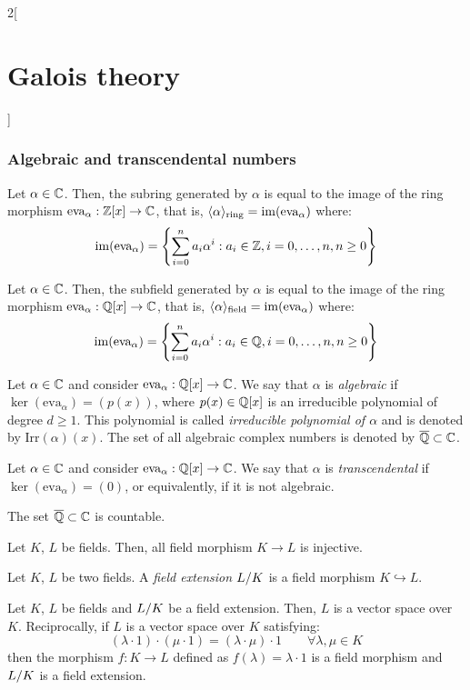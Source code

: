 \documentclass[../../../main.tex]{subfiles}
\begin{document}
\begin{multicols}{2}[\section{Galois theory}]
  \subsubsection*{Algebraic and transcendental numbers}
  \begin{prop}
    Let $\alpha\in\mathbb{C}$. Then, the subring generated by $\alpha$ is equal to the image of the ring morphism $\text{eva}_\alpha:\mathbb{Z}[x]\rightarrow\mathbb{C}$, that is, $\langle\alpha\rangle_\text{ring}=\operatorname{im}(\text{eva}_\alpha)$ where: $$\operatorname{im}(\text{eva}_\alpha)=\left\{\sum_{i=0}^na_i\alpha^i:a_i\in\mathbb{Z},i=0,\ldots, n,n\geq 0\right\}$$
  \end{prop}
  \begin{prop}
    Let $\alpha\in\mathbb{C}$. Then, the subfield generated by $\alpha$ is equal to the image of the ring morphism $\text{eva}_\alpha:\mathbb{Q}[x]\rightarrow\mathbb{C}$, that is, $\langle\alpha\rangle_\text{field}=\operatorname{im}(\text{eva}_\alpha)$ where: $$\operatorname{im}(\text{eva}_\alpha)=\left\{\sum_{i=0}^na_i\alpha^i:a_i\in\mathbb{Q},i=0,\ldots, n,n\geq 0\right\}$$
  \end{prop}
  \begin{definition}
    Let $\alpha\in\mathbb{C}$ and consider $\text{eva}_\alpha:\mathbb{Q}[x]\rightarrow\mathbb{C}$. We say that $\alpha$ is \textit{algebraic} if $\ker(\text{eva}_\alpha)=(p(x))$, where $p(x)\in\mathbb{Q}[x]$ is an irreducible polynomial of degree $d\geq 1$. This polynomial is called \textit{irreducible polynomial of $\alpha$} and is denoted by $\text{Irr}(\alpha)(x)$. The set of all algebraic complex numbers is denoted by $\overline{\mathbb{Q}}\subset\mathbb{C}$.
  \end{definition}
  \begin{definition}
    Let $\alpha\in\mathbb{C}$ and consider $\text{eva}_\alpha:\mathbb{Q}[x]\rightarrow\mathbb{C}$. We say that $\alpha$ is \textit{transcendental} if $\ker(\text{eva}_\alpha)=(0)$, or equivalently, if it is not algebraic.
  \end{definition}
  \begin{theorem}
    The set $\overline{\mathbb{Q}}\subset\mathbb{C}$ is countable.
  \end{theorem}
  \begin{prop}
    Let $K$, $L$ be fields. Then, all field morphism $K\rightarrow L$ is injective.
  \end{prop}
  \begin{definition}
    Let $K$, $L$ be two fields. A \textit{field extension $\quot{L}{K}$} is a field morphism $K\hookrightarrow L$.
  \end{definition}
  \begin{prop}
    Let $K$, $L$ be fields and $\quot{L}{K}$ be a field extension. Then, $L$ is a vector space over $K$. Reciprocally, if $L$ is a vector space over $K$ satisfying: $$(\lambda\cdot 1)\cdot(\mu\cdot 1)=(\lambda\cdot\mu)\cdot 1\qquad\forall\lambda,\mu\in K$$ then the morphism $f:K\rightarrow L$ defined as $f(\lambda)=\lambda\cdot 1$ is a field morphism and $\quot{L}{K}$ is a field extension.

\end{prop}
\end{multicols}
\end{document}
